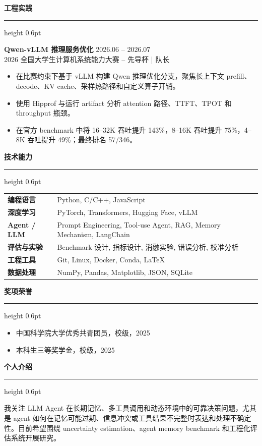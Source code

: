 \documentclass[10pt,a4paper]{ctexart}
\newcommand{\resumeSection}[1]{%
    \vspace{9pt}
    {\large\bfseries\color{accent} #1}
    \vspace{2pt}
    \hrule height 0.6pt
    \vspace{5pt}
}
\newcommand{\resumeProjectHeading}[3]{%
    \textbf{#1} \hfill {\small #3}\\
    {\small #2}
    \vspace{2pt}
}
\newcommand{\resumeItem}[1]{\item #1}
\begin{document}
\resumeSection{工程实践}
\resumeProjectHeading{Qwen-vLLM 推理服务优化}{2026 全国大学生计算机系统能力大赛 -- 先导杯 \quad | \quad 队长}{2026.06 -- 2026.07}
\begin{itemize}
    \resumeItem{在比赛约束下基于 vLLM 构建 Qwen 推理优化分支，聚焦长上下文 prefill、decode、KV cache、采样热路径和自定义算子开销。}
    \resumeItem{使用 Hipprof 与运行 artifact 分析 attention 路径、TTFT、TPOT 和 throughput 瓶颈。}
    \resumeItem{在官方 benchmark 中将 16--32K 吞吐提升 143\%，8--16K 吞吐提升 75\%，4--8K 吞吐提升 49\%；最终排名 57/346。}
\end{itemize}

\resumeSection{技术能力}
\begin{tabularx}{\textwidth}{@{}>{\bfseries}l@{\quad}X@{}}
    编程语言 & Python, C/C++, JavaScript \\
    深度学习 & PyTorch, Transformers, Hugging Face, vLLM \\
    Agent / LLM & Prompt Engineering, Tool-use Agent, RAG, Memory Mechanism, LangChain \\
    评估与实验 & Benchmark 设计, 指标设计, 消融实验, 错误分析, 校准分析 \\
    工程工具 & Git, Linux, Docker, Conda, LaTeX \\
    数据处理 & NumPy, Pandas, Matplotlib, JSON, SQLite \\
\end{tabularx}

\resumeSection{奖项荣誉}
\begin{itemize}
    \resumeItem{中国科学院大学优秀共青团员，校级，2025}
    \resumeItem{本科生三等奖学金，校级，2025}
\end{itemize}

\resumeSection{个人介绍}
我关注 LLM Agent 在长期记忆、多工具调用和动态环境中的可靠决策问题，尤其是 agent 如何在记忆可能过期、信息冲突或工具结果不完整时表达和处理不确定性。目前希望围绕 uncertainty estimation、agent memory benchmark 和工程化评估系统开展研究。
\end{document}
